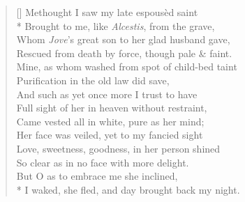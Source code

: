 \documentclass[MAIN]{subfiles}
\begin{document}
\begin{verse}[\versewidth]
Methought I saw my late espous\`ed saint\\*
\vin Brought to me, like \emph{Alcestis}, from the grave,\\
\vin Whom \emph{Jove}'s great son to her glad husband gave,\\
Rescued from death by force, though pale \& faint.\\
Mine, as whom washed from spot of child-bed taint\\
\vin Purification in the old law did save,\\
\vin And such as yet once more I trust to have\\
Full sight of her in heaven without restraint,\\
Came vested all in white, pure as her mind;\\
\vin Her face was veiled, yet to my fancied sight\\
Love, sweetness, goodness, in her person shined\\
\vin So clear as in no face with more delight.\\
But O as to embrace me she inclined,\\*
\vin I waked, she fled, and day brought back my night.
\end{verse}
\end{document}

